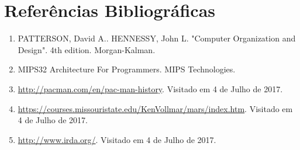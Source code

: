 \documentclass[12pt, a4paper, twocolumn]{article}
\begin{document}

\section{Referências Bibliográficas}

\begin{enumerate}
    \item PATTERSON, David A.. HENNESSY, John L. "Computer Organization and Design". 4th edition. Morgan-Kalman.
    \item MIPS32 Architecture For Programmers. MIPS Technologies.
    \item \url{http://pacman.com/en/pac-man-history}. Visitado em 4 de Julho de 2017.
    \item \url{https://courses.missouristate.edu/KenVollmar/mars/index.htm}. Visitado em 4 de Julho de 2017.
    \item \url{http://www.irda.org/}. Visitado em 4 de Julho de 2017.

\end{enumerate}
\end{document}
